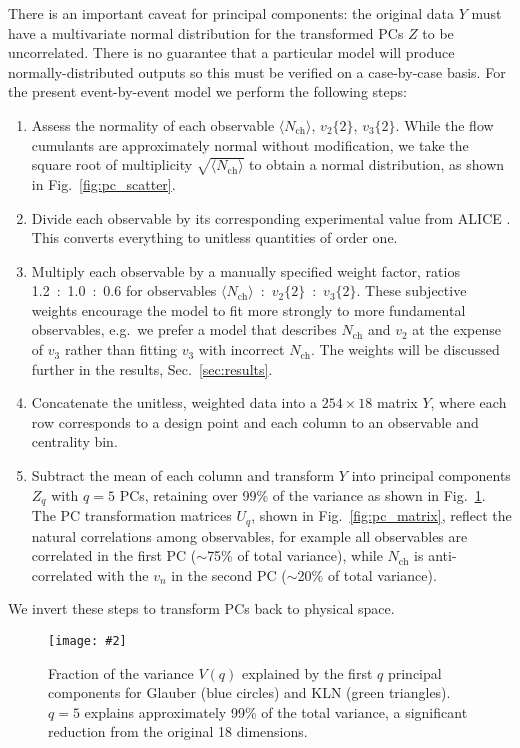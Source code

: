 \documentclass[aps,prc,reprint,superscriptaddress,amsmath]{revtex4-1}
\newcommand{\colfig}[3][t]{
  \begin{figure}[#1]
    \texttt{[image: \#2]}
    \caption{\label{fig:#2}#3}
  \end{figure}
}
\newcommand{\avg}[1]{\langle #1 \rangle}
\newcommand{\nch}{N_\text{ch}}
\newcommand{\vnk}[2]{v_#1\{#2\}}
\begin{document}
There is an important caveat for principal components:
the original data $Y$ must have a multivariate normal distribution for the transformed PCs $Z$ to be uncorrelated.
There is no guarantee that a particular model will produce normally-distributed outputs so this must be verified on a case-by-case basis.
For the present event-by-event model we perform the following steps:
\begin{enumerate}
  \item Assess the normality of each observable $\avg\nch$, $\vnk 2 2$, $\vnk 3 2$.
    While the flow cumulants are approximately normal without modification, we take the square root of multiplicity $\sqrt{\avg\nch}$ to obtain a normal distribution, as shown in Fig.~\ref{fig:pc_scatter}.
  \item Divide each observable by its corresponding experimental value from ALICE \cite{Abelev:2014mda}.
    This converts everything to unitless quantities of order one.
  \item Multiply each observable by a manually specified weight factor, ratios 1.2~:~1.0~:~0.6 for observables $\avg\nch$~:~$\vnk 2 2$~:~$\vnk 3 2$.
    These subjective weights encourage the model to fit more strongly to more fundamental observables, e.g.\ we prefer a model that describes $\nch$ and $v_2$ at the expense of $v_3$ rather than fitting $v_3$ with incorrect $\nch$.
    The weights will be discussed further in the results, Sec.~\ref{sec:results}.
  \item Concatenate the unitless, weighted data into a $254 \times 18$ matrix $Y$, where each row corresponds to a design point and each column to an observable and centrality bin.
  \item Subtract the mean of each column and transform $Y$ into principal components $Z_q$ with $q = 5$ PCs, retaining over 99\% of the variance as shown in Fig.~\ref{fig:pc_var}.
    The PC transformation matrices $U_q$, shown in Fig.~\ref{fig:pc_matrix}, reflect the natural correlations among observables, for example all observables are correlated in the first PC (${\sim}$75\% of total variance), while $N_\text{ch}$ is anti-correlated with the $v_n$ in the second PC (${\sim}$20\% of total variance).
\end{enumerate}
We invert these steps to transform PCs back to physical space.

\colfig[t]{pc_var}{
  Fraction of the variance $V(q)$ explained by the first $q$ principal components for Glauber (blue circles) and KLN (green triangles).
  $q = 5$ explains approximately 99\% of the total variance, a significant reduction from the original 18 dimensions.
}
\end{document}
